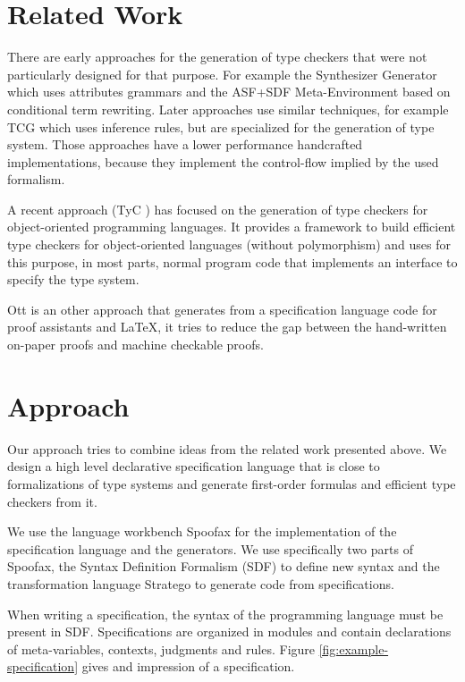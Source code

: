 \documentclass{acm_proc_article-sp}
\begin{document}
\section{Related Work}
There are early approaches for the generation of type checkers that
were not particularly designed for that purpose. For example the
Synthesizer Generator \cite{Reps:1984:SG:800020.808247} which uses
attributes grammars and the ASF+SDF Meta-Environment
\cite{vandenBrand:2001:AMC:647477.727788} based on conditional term
rewriting. Later approaches use similar techniques, for example TCG
\cite{phd/de/Gast2005} which uses inference rules, but are specialized
for the generation of type system. Those approaches have a lower
performance handcrafted implementations, because they implement the
control-flow implied by the used formalism.

A recent approach (TyC \cite{ortin2014automatic}) has focused on the
generation of type checkers for object-oriented programming
languages. It provides a framework to build efficient type checkers
for object-oriented languages (without polymorphism) and uses for this
purpose, in most parts, normal program code that implements an
interface to specify the type system.

Ott \cite{journals/jfp/SewellNOPRSS10} is an other approach that
generates from a specification language code for proof assistants and
\LaTeX, it tries to reduce the gap between the hand-written on-paper
proofs and machine checkable proofs.
\section{Approach}
Our approach tries to combine ideas from the related work presented
above. We design a high level declarative specification language that
is close to formalizations of type systems and generate first-order
formulas and efficient type checkers from it.

We use the language workbench Spoofax \cite{KatsVisser2010} for the
implementation of the specification language and the generators. We
use specifically two parts of Spoofax, the Syntax Definition Formalism
(SDF) to define new syntax and the transformation language Stratego to
generate code from specifications. 

When writing a specification, the syntax of the programming language
must be present in SDF. Specifications are organized in modules and
contain declarations of meta-variables, contexts, judgments and
rules. Figure \ref{fig:example-specification} gives and impression of a
specification.
\end{document}
